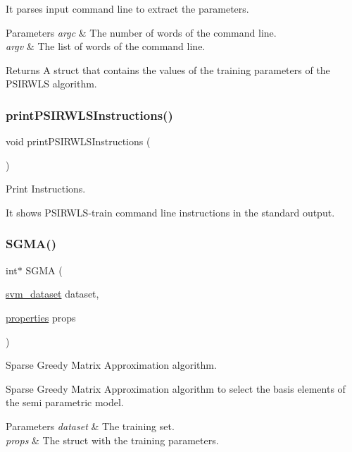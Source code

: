It parses input command line to extract the parameters. 
\begin{DoxyParams}{Parameters}
{\em argc} & The number of words of the command line. \\
\hline
{\em argv} & The list of words of the command line. \\
\hline
\end{DoxyParams}
\begin{DoxyReturn}{Returns}
A struct that contains the values of the training parameters of the P\+S\+I\+R\+W\+LS algorithm. 
\end{DoxyReturn}
\hypertarget{PSIRWLS-train_8h_af71e97e89750872ce608bffd01d2af41}{}\label{PSIRWLS-train_8h_af71e97e89750872ce608bffd01d2af41} 
\subsubsection{\texorpdfstring{print\+P\+S\+I\+R\+W\+L\+S\+Instructions()}{printPSIRWLSInstructions()}}
{\ttfamily void print\+P\+S\+I\+R\+W\+L\+S\+Instructions (\begin{DoxyParamCaption}{ }\end{DoxyParamCaption})}



Print Instructions. 

It shows P\+S\+I\+R\+W\+L\+S-\/train command line instructions in the standard output. \hypertarget{PSIRWLS-train_8h_a50a6e1f36a010feb91db9b9b38679948}{}\label{PSIRWLS-train_8h_a50a6e1f36a010feb91db9b9b38679948} 
\subsubsection{\texorpdfstring{S\+G\+M\+A()}{SGMA()}}
{\ttfamily int$\ast$ S\+G\+MA (\begin{DoxyParamCaption}\item[{\hyperlink{structsvm__dataset}{svm\+\_\+dataset}}]{dataset,  }\item[{\hyperlink{structproperties}{properties}}]{props }\end{DoxyParamCaption})}



Sparse Greedy Matrix Approximation algorithm. 

Sparse Greedy Matrix Approximation algorithm to select the basis elements of the semi parametric model. 
\begin{DoxyParams}{Parameters}
{\em dataset} & The training set. \\
\hline
{\em props} & The struct with the training parameters. \\
\hline
\end{DoxyParams}
